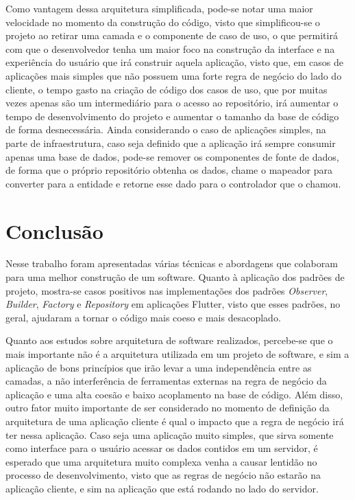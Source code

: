 \documentclass[12pt, %
openright, 
oneside, %
a4paper,    %
brazil]{facom-ufu-abntex2}
\begin{document}
Como vantagem dessa arquitetura simplificada, pode-se notar uma maior velocidade no momento da construção do código, visto que simplificou-se o projeto ao retirar uma camada e o componente de caso de uso, o que permitirá com que o desenvolvedor tenha um maior foco na construção da interface e na experiência do usuário que irá construir aquela aplicação, visto que, em casos de aplicações mais simples que não possuem uma forte regra de negócio do lado do cliente, o tempo gasto na criação de código dos casos de uso, que por muitas vezes apenas são um intermediário para o acesso ao repositório, irá aumentar o tempo de desenvolvimento do projeto e aumentar o tamanho da base de código de forma desnecessária. Ainda considerando o caso de aplicações simples, na parte de infraestrutura, caso seja definido que a aplicação irá sempre consumir apenas uma base de dados, pode-se remover os componentes de fonte de dados, de forma que o próprio repositório obtenha os dados, chame o mapeador para converter para a entidade e retorne esse dado para o controlador que o chamou.

\chapter{Conclusão}

Nesse trabalho foram apresentadas várias técnicas e abordagens que colaboram para uma melhor construção de um software. Quanto à aplicação dos padrões de projeto, mostra-se casos positivos nas implementações dos padrões \textit{Observer}, \textit{Builder}, \textit{Factory} e \textit{Repository} em aplicações Flutter, visto que esses padrões, no geral, ajudaram a tornar o código mais coeso e mais desacoplado.

Quanto aos estudos sobre arquitetura de software realizados, percebe-se que o mais importante não é a arquitetura utilizada em um projeto de software, e sim a aplicação de bons princípios que irão levar a uma independência entre as camadas, a não interferência de ferramentas externas na regra de negócio da aplicação e uma alta coesão e baixo acoplamento na base de código. Além disso, outro fator muito importante de ser considerado no momento de definição da arquitetura de uma aplicação cliente é qual o impacto que a regra de negócio irá ter nessa aplicação. Caso seja uma aplicação muito simples, que sirva somente como interface para o usuário acessar os dados contidos em um servidor, é esperado que uma arquitetura muito complexa venha a causar lentidão no processo de desenvolvimento, visto que as regras de negócio não estarão na aplicação cliente, e sim na aplicação que está rodando no lado do servidor.
\end{document}
